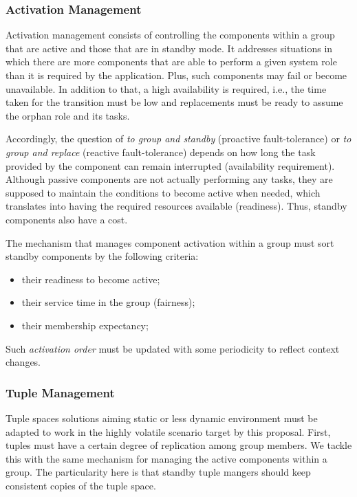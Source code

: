 

\subsubsection{Activation Management}

Activation management consists of controlling the components within a group that are active and those that are in standby mode. It addresses situations in which there are more components that are able to perform a given system role than it is required by the application. Plus, such components may fail or become unavailable. In addition to that, a high availability is required, i.e., the time taken for the transition must be low and replacements must be ready to assume the orphan role and its tasks.

Accordingly, the question of \textit{to group and standby} (proactive fault-tolerance) or \textit{to group and replace} (reactive fault-tolerance) depends on how long the task provided by the component can remain interrupted (availability requirement). Although passive components are not actually performing any tasks, they are supposed to maintain the conditions to become active when needed, which translates into having the required resources available (readiness). Thus, standby components also have a cost. 

The mechanism that manages component activation within a group must sort standby components by the following criteria:

\begin{itemize}

\item their readiness to become active;

\item their service time in the group (fairness);

\item their membership expectancy;

\end{itemize}

Such \textit{activation order} must be updated with some periodicity to reflect context changes. 

\subsubsection{Tuple Management}

Tuple spaces solutions aiming static or less dynamic environment must be adapted to work in the highly volatile scenario target by this proposal. First, tuples must have a certain degree of replication among group members. We tackle this with the same mechanism for managing the active components within a group. The particularity here is that standby tuple mangers should keep consistent copies of the tuple space.

